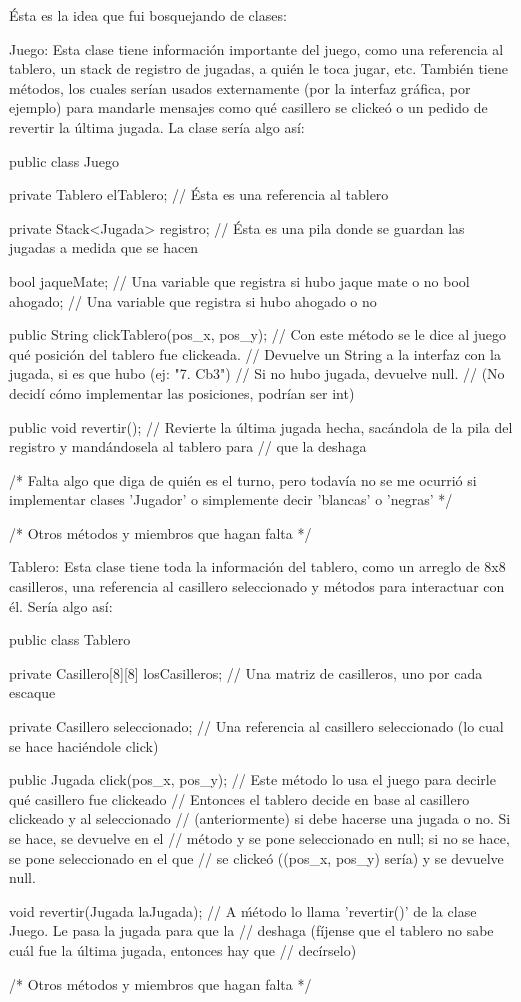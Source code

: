 Ésta es la idea que fui bosquejando de clases:

Juego:
Esta clase tiene información importante del juego, como una referencia al tablero, un stack de registro de jugadas, a quién le toca jugar, etc. También tiene métodos, los cuales serían usados externamente (por la interfaz gráfica, por ejemplo) para mandarle mensajes como qué casillero se clickeó o un pedido de revertir la última jugada. La clase sería algo así:

public class Juego {
	
	private Tablero elTablero; // Ésta es una referencia al tablero

	private Stack<Jugada> registro; // Ésta es una pila donde se guardan las jugadas a medida que se hacen

	bool jaqueMate;	// Una variable que registra si hubo jaque mate o no
	bool ahogado;	// Una variable que registra si hubo ahogado o no

	public String clickTablero(pos_x, pos_y);	// Con este método se le dice al juego qué posición del tablero fue clickeada.
												// Devuelve un String a la interfaz con la jugada, si es que hubo (ej: "7. Cb3")
												// Si no hubo jugada, devuelve null.
												// (No decidí cómo implementar las posiciones, podrían ser int)

	public void revertir();	// Revierte la última jugada hecha, sacándola de la pila del registro y mandándosela al tablero para
							// que la deshaga
	
	/* Falta algo que diga de quién es el turno, pero todavía no se me ocurrió si implementar clases 'Jugador' o simplemente decir 'blancas' o 'negras' */

	/* Otros métodos y miembros que hagan falta */
}

Tablero:
Esta clase tiene toda la información del tablero, como un arreglo de 8x8 casilleros, una referencia al casillero seleccionado y métodos para interactuar con él. Sería algo así:

public class Tablero {
	
	private Casillero[8][8] losCasilleros;	// Una matriz de casilleros, uno por cada escaque

	private Casillero seleccionado;	// Una referencia al casillero seleccionado (lo cual se hace haciéndole click)

	public Jugada click(pos_x, pos_y);	// Este método lo usa el juego para decirle qué casillero fue clickeado
										// Entonces el tablero decide en base al casillero clickeado y al seleccionado
										// (anteriormente) si debe hacerse una jugada o no. Si se hace, se devuelve en el
										// método y se pone seleccionado en null; si no se hace, se pone seleccionado en el que // se clickeó ((pos_x, pos_y) sería) y se devuelve null.

	void revertir(Jugada laJugada);		// A ḿétodo lo llama 'revertir()' de la clase Juego. Le pasa la jugada para que la
										// deshaga (fíjense que el tablero no sabe cuál fue la última jugada, entonces hay que
										// decírselo)

	/* Otros métodos y miembros que hagan falta */
}

